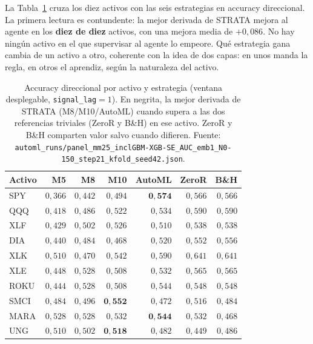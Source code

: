 La Tabla~\ref{tab:mp-accuracy} cruza los diez activos con las seis estrategias en accuracy direccional. La primera lectura es contundente: la mejor derivada de STRATA mejora al agente en los \textbf{diez de diez} activos, con una mejora media de $+0{,}086$. No hay ningún activo en el que supervisar al agente lo empeore. Qué estrategia gana cambia de un activo a otro, coherente con la idea de dos capas: en unos manda la regla, en otros el aprendiz, según la naturaleza del activo.

\begin{table}[htbp]
\centering
\caption{Accuracy direccional por activo y estrategia (ventana desplegable, \texttt{signal\_lag}${}=1$). En negrita, la mejor derivada de STRATA (M8/M10/AutoML) cuando supera a las dos referencias triviales (ZeroR y B\&H) en ese activo. ZeroR y B\&H comparten valor salvo cuando difieren. Fuente: \texttt{automl\_runs/panel\_mm25\_inclGBM-XGB-SE\_AUC\_emb1\_N0-150\_step21\_kfold\_seed42.json}.}
\label{tab:mp-accuracy}
\begin{tabular}{lrrrrrr}
\toprule
Activo & M5 & M8 & M10 & AutoML & ZeroR & B\&H \\
\midrule
SPY  & $0{,}366$ & $0{,}442$ & $0{,}494$ & $\mathbf{0{,}574}$ & $0{,}566$ & $0{,}566$ \\
QQQ  & $0{,}418$ & $0{,}486$ & $0{,}522$ & $0{,}534$ & $0{,}590$ & $0{,}590$ \\
XLF  & $0{,}429$ & $0{,}502$ & $0{,}526$ & $0{,}510$ & $0{,}538$ & $0{,}538$ \\
DIA  & $0{,}440$ & $0{,}484$ & $0{,}468$ & $0{,}520$ & $0{,}552$ & $0{,}556$ \\
XLK  & $0{,}510$ & $0{,}470$ & $0{,}542$ & $0{,}590$ & $0{,}641$ & $0{,}641$ \\
XLE  & $0{,}448$ & $0{,}528$ & $0{,}508$ & $0{,}532$ & $0{,}565$ & $0{,}565$ \\
ROKU & $0{,}444$ & $0{,}528$ & $0{,}508$ & $0{,}544$ & $0{,}548$ & $0{,}548$ \\
SMCI & $0{,}484$ & $0{,}496$ & $\mathbf{0{,}552}$ & $0{,}472$ & $0{,}516$ & $0{,}484$ \\
MARA & $0{,}528$ & $0{,}528$ & $0{,}532$ & $\mathbf{0{,}544}$ & $0{,}532$ & $0{,}468$ \\
UNG  & $0{,}510$ & $0{,}502$ & $\mathbf{0{,}518}$ & $0{,}482$ & $0{,}449$ & $0{,}486$ \\
\bottomrule
\end{tabular}
\end{table}

